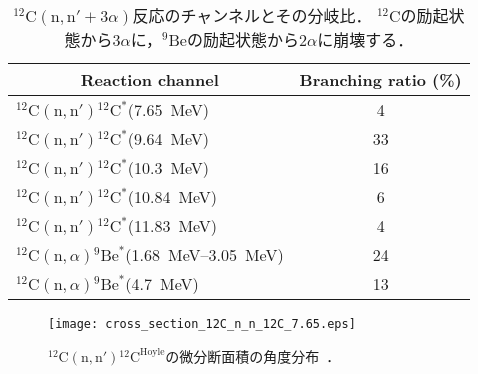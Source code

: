 \documentclass[../master]{subfiles}
\begin{document}
\begin{table}
  \centering
  \caption[${}^{12}\mathrm{C}(\mathrm{n},\mathrm{n}'+3\alpha)$反応のチャンネルとその分岐比．]
          {${}^{12}\mathrm{C}(\mathrm{n},\mathrm{n}'+3\alpha)$反応のチャンネルとその分岐比．
  ${}^{12}\mathrm{C}$の励起状態から$3\alpha$に，${}^{9}\mathrm{Be}$の励起状態から$2\alpha$に崩壊する．}
  \label{tab::branchingratio}
  \begin{tabular}{lc}
    \toprule
    \multicolumn{1}{c}{Reaction channel} & Branching ratio (\%)\\
    \midrule
    ${}^{12}\mathrm{C}(\mathrm{n},\mathrm{n}'){}^{12}\mathrm{C}^{*}$(\SI{7.65}{\mega\electronvolt}) & 4\\
    ${}^{12}\mathrm{C}(\mathrm{n},\mathrm{n}'){}^{12}\mathrm{C}^{*}$(\SI{9.64}{\mega\electronvolt}) & 33\\
    ${}^{12}\mathrm{C}(\mathrm{n},\mathrm{n}'){}^{12}\mathrm{C}^{*}$(\SI{10.3}{\mega\electronvolt}) & 16\\
    ${}^{12}\mathrm{C}(\mathrm{n},\mathrm{n}'){}^{12}\mathrm{C}^{*}$(\SI{10.84}{\mega\electronvolt}) & 6\\
    ${}^{12}\mathrm{C}(\mathrm{n},\mathrm{n}'){}^{12}\mathrm{C}^{*}$(\SI{11.83}{\mega\electronvolt}) & 4\\
    ${}^{12}\mathrm{C}(\mathrm{n},\alpha){}^{9}\mathrm{Be}^{*}$(\SIrange{1.68}{3.05}{\mega\electronvolt}) & 24\\
    ${}^{12}\mathrm{C}(\mathrm{n},\alpha){}^{9}\mathrm{Be}^{*}$(\SI{4.7}{\mega\electronvolt}) & 13\\
    \bottomrule
  \end{tabular}
\end{table}

\begin{figure}
  \centering
  \texttt{[image: cross\_section\_12C\_n\_n\_12C\_7.65.eps]}
  \caption[${}^{12}\mathrm{C}(\mathrm{n},\mathrm{n}'){}^{12}\mathrm{C}^{\text{Hoyle}}$の微分断面積の角度分布．]
          {${}^{12}\mathrm{C}(\mathrm{n},\mathrm{n}'){}^{12}\mathrm{C}^{\text{Hoyle}}$の微分断面積の角度分布~\cite{kondoetal}．}
  \label{fig::sig_angle_dist}
\end{figure}%
\end{document}
